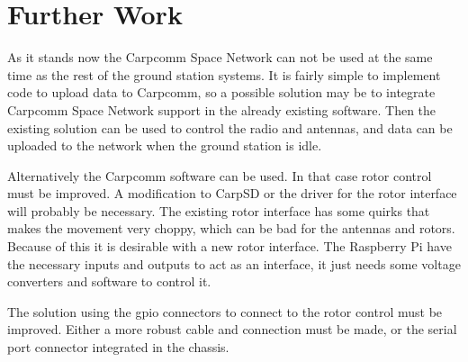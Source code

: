 \section{Further Work}
As it stands now the Carpcomm Space Network can not be used at the same time as the rest of the ground station systems. It is fairly simple to implement code to upload data to Carpcomm, so a possible solution may be to integrate Carpcomm Space Network support in the already existing software. Then the existing solution can be used to control the radio and antennas, and data can be uploaded to the network when the ground station is idle.

Alternatively the Carpcomm software can be used. In that case rotor control must be improved. A modification to CarpSD or the driver for the rotor interface will probably be necessary. The existing rotor interface has some quirks that makes the movement very choppy, which can be bad for the antennas and rotors. Because of this it is desirable with a new rotor interface. The Raspberry Pi have the necessary inputs and outputs to act as an interface, it just needs some voltage converters and software to control it.

The solution using the gpio connectors to connect to the rotor control must be improved. Either a more robust cable and connection must be made, or the serial port connector integrated in the chassis.